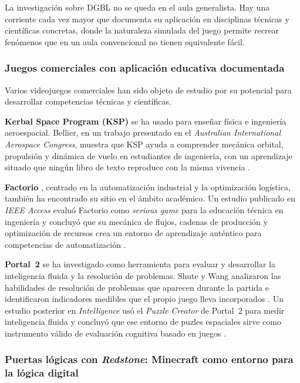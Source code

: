 \documentclass[a4paper,12pt]{article}
\begin{document}
La investigación sobre DGBL no se queda en el aula generalista. Hay una corriente cada vez mayor que documenta su aplicación en disciplinas técnicas y científicas concretas, donde la naturaleza simulada del juego permite recrear fenómenos que en un aula convencional no tienen equivalente fácil.

\subsubsection{Juegos comerciales con aplicación educativa documentada}

Varios videojuegos comerciales han sido objeto de estudio por su potencial para desarrollar competencias técnicas y científicas.

\textbf{Kerbal Space Program (KSP)} \citep{ksp} se ha usado para enseñar física e ingeniería aeroespacial. Bellier, en un trabajo presentado en el \textit{Australian International Aerospace Congress}, muestra que KSP ayuda a comprender mecánica orbital, propulsión y dinámica de vuelo en estudiantes de ingeniería, con un aprendizaje situado que ningún libro de texto reproduce con la misma vivencia \citep{ksp2023aiac}.

\textbf{Factorio} \citep{factorio}, centrado en la automatización industrial y la optimización logística, también ha encontrado su sitio en el ámbito académico. Un estudio publicado en \textit{IEEE Access} evaluó Factorio como \textit{serious game} para la educación técnica en ingeniería y concluyó que su mecánica de flujos, cadenas de producción y optimización de recursos crea un entorno de aprendizaje auténtico para competencias de automatización \citep{factorio2025ieee}.

\textbf{Portal~2} \citep{portal2} se ha investigado como herramienta para evaluar y desarrollar la inteligencia fluida y la resolución de problemas. Shute y Wang analizaron las habilidades de resolución de problemas que aparecen durante la partida e identificaron indicadores medibles que el propio juego lleva incorporados \citep{shute2015portal}. Un estudio posterior en \textit{Intelligence} usó el \textit{Puzzle Creator} de Portal~2 para medir inteligencia fluida y concluyó que ese entorno de puzles espaciales sirve como instrumento válido de evaluación cognitiva basado en juegos \citep{portal2intelligence2016}.

\subsubsection{Puertas lógicas con \textit{Redstone}: Minecraft como entorno para la lógica digital}
\end{document}
